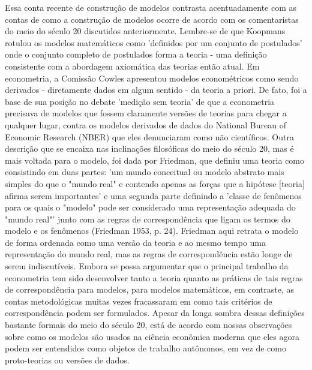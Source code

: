 \documentclass[12pt]{article}
\begin{document}
Essa conta recente de construção de modelos contrasta acentuadamente com as contas de como a construção de modelos ocorre de acordo com os comentaristas do meio do século 20 discutidos anteriormente. Lembre-se de que Koopmans rotulou os modelos matemáticos como 'definidos por um conjunto de postulados' onde o conjunto completo de postulados forma a teoria - uma definição consistente com a abordagem axiomática das teorias então atual. Em econometria, a Comissão Cowles apresentou modelos econométricos como sendo derivados - diretamente dados em algum sentido - da teoria a priori. De fato, foi a base de sua posição no debate 'medição sem teoria' de que a econometria precisava de modelos que fossem claramente versões de teorias para chegar a qualquer lugar, contra os modelos derivados de dados do National Bureau of Economic Research (NBER) que eles denunciaram como não científicos. Outra descrição que se encaixa nas inclinações filosóficas do meio do século 20, mas é mais voltada para o modelo, foi dada por Friedman, que definiu uma teoria como consistindo em duas partes: 'um mundo conceitual ou modelo abstrato mais simples do que o "mundo real" e contendo apenas as forças que a hipótese [teoria] afirma serem importantes' e uma segunda parte definindo a 'classe de fenômenos para os quais o "modelo" pode ser considerado uma representação adequada do "mundo real"' junto com as regras de correspondência que ligam os termos do modelo e os fenômenos (Friedman 1953, p. 24). Friedman aqui retrata o modelo de forma ordenada como uma versão da teoria e ao mesmo tempo uma representação do mundo real, mas as regras de correspondência estão longe de serem indiscutíveis. Embora se possa argumentar que o principal trabalho da econometria tem sido desenvolver tanto a teoria quanto as práticas de tais regras de correspondência para modelos, para modelos matemáticos, em contraste, as contas metodológicas muitas vezes fracassaram em como tais critérios de correspondência podem ser formulados. Apesar da longa sombra dessas definições bastante formais do meio do século 20, está de acordo com nossas observações sobre como os modelos são usados na ciência econômica moderna que eles agora podem ser entendidos como objetos de trabalho autônomos, em vez de como proto-teorias ou versões de dados.
\end{document}
